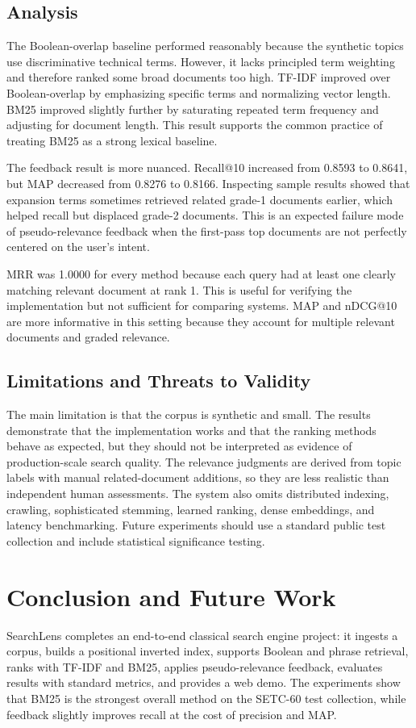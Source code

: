\documentclass[sigconf,nonacm]{acmart}
\begin{document}
\subsection{Analysis}
The Boolean-overlap baseline performed reasonably because the synthetic topics use discriminative technical terms. However, it lacks principled term weighting and therefore ranked some broad documents too high. TF-IDF improved over Boolean-overlap by emphasizing specific terms and normalizing vector length. BM25 improved slightly further by saturating repeated term frequency and adjusting for document length. This result supports the common practice of treating BM25 as a strong lexical baseline.

The feedback result is more nuanced. Recall@10 increased from 0.8593 to 0.8641, but MAP decreased from 0.8276 to 0.8166. Inspecting sample results showed that expansion terms sometimes retrieved related grade-1 documents earlier, which helped recall but displaced grade-2 documents. This is an expected failure mode of pseudo-relevance feedback when the first-pass top documents are not perfectly centered on the user's intent.

MRR was 1.0000 for every method because each query had at least one clearly matching relevant document at rank 1. This is useful for verifying the implementation but not sufficient for comparing systems. MAP and nDCG@10 are more informative in this setting because they account for multiple relevant documents and graded relevance.

\subsection{Limitations and Threats to Validity}
The main limitation is that the corpus is synthetic and small. The results demonstrate that the implementation works and that the ranking methods behave as expected, but they should not be interpreted as evidence of production-scale search quality. The relevance judgments are derived from topic labels with manual related-document additions, so they are less realistic than independent human assessments. The system also omits distributed indexing, crawling, sophisticated stemming, learned ranking, dense embeddings, and latency benchmarking. Future experiments should use a standard public test collection and include statistical significance testing.

\section{Conclusion and Future Work}
SearchLens completes an end-to-end classical search engine project: it ingests a corpus, builds a positional inverted index, supports Boolean and phrase retrieval, ranks with TF-IDF and BM25, applies pseudo-relevance feedback, evaluates results with standard metrics, and provides a web demo. The experiments show that BM25 is the strongest overall method on the SETC-60 test collection, while feedback slightly improves recall at the cost of precision and MAP.
\end{document}
